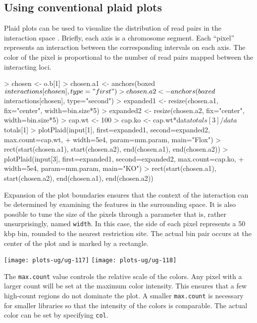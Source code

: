 \documentclass[12pt]{report}
\renewenvironment{Schunk}{\vspace{0pt}}{\vspace{0pt}}
\newcommand{\code}[1]{{\small\texttt{#1}}}
\begin{document}
\subsection{Using conventional plaid plots}
Plaid plots can be used to visualize the distribution of read pairs in the interaction space \citep{lieberman2009comprehensive}. 
Briefly, each axis is a chromosome segment. 
Each ``pixel'' represents an interaction between the corresponding intervals on each axis. 
The color of the pixel is proportional to the number of read pairs mapped between the interacting loci.




\begin{Schunk}
\begin{Sinput}
> chosen <- o.b[1]
> chosen.a1 <- anchors(boxed$interactions[chosen], type="first")
> chosen.a2 <- anchors(boxed$interactions[chosen], type="second")
> expanded1 <- resize(chosen.a1, fix="center", width=bin.size*5)
> expanded2 <- resize(chosen.a2, fix="center", width=bin.size*5)
> cap.wt <- 100
> cap.ko <- cap.wt*data$totals[3]/data$totals[1]
> plotPlaid(input[1], first=expanded1, second=expanded2, max.count=cap.wt, 
+     width=5e4, param=mm.param, main="Flox")
> rect(start(chosen.a1), start(chosen.a2), end(chosen.a1), end(chosen.a2))
> plotPlaid(input[3], first=expanded1, second=expanded2, max.count=cap.ko, 
+     width=5e4, param=mm.param, main="KO")
> rect(start(chosen.a1), start(chosen.a2), end(chosen.a1), end(chosen.a2))
\end{Sinput}
\end{Schunk}


Expansion of the plot boundaries ensures that the context of the interaction can be determined by examining the features in the surrounding space. 
It is also possible to tune the size of the pixels through a parameter that is, rather unsurprisingly, named \code{width}.
In this case, the side of each pixel represents a 50 kbp bin, rounded to the nearest restriction site.
The actual bin pair occurs at the center of the plot and is marked by a rectangle.

\begin{center}
\texttt{[image: plots-ug/ug-117]}
\texttt{[image: plots-ug/ug-118]}
\end{center}

The \code{max.count} value controls the relative scale of the colors. 
Any pixel with a larger count will be set at the maximum color intensity.
This ensures that a few high-count regions do not dominate the plot.
A smaller \code{max.count} is necessary for smaller libraries so that the intensity of the colors is comparable.
The actual color can be set by specifying \code{col}.
\end{document}
